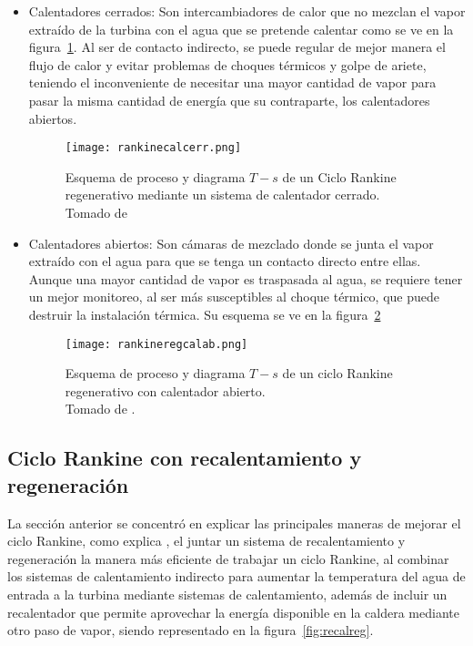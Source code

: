 \begin{itemize}
  \item Calentadores cerrados: Son intercambiadores de calor que no mezclan el vapor extraído de la turbina con el agua que se pretende calentar como se ve en la figura~\ref{fig:rankinecerr}. Al ser de contacto indirecto, se puede regular de mejor manera el flujo de calor y evitar problemas de choques térmicos y golpe de ariete, teniendo el inconveniente de necesitar una mayor cantidad de vapor para pasar la misma cantidad de energía que su contraparte, los calentadores abiertos.
    \begin{figure}[H]
  \begin{center}
    \texttt{[image: rankinecalcerr.png]}
  \end{center}
  \caption{Esquema de proceso y diagrama $T-s$ de un Ciclo Rankine regenerativo mediante un sistema de calentador cerrado. \\Tomado de \textcite{ccengel2006termodinamica}}
  \label{fig:rankinecerr}
\end{figure}
\pagebreak
  \item Calentadores abiertos: Son cámaras de mezclado donde se junta el vapor extraído con el agua para que se tenga un contacto directo entre ellas. Aunque una mayor cantidad de vapor es traspasada al agua, se requiere tener un mejor monitoreo, al ser más susceptibles al choque térmico, que puede destruir la instalación térmica. Su esquema se ve en la figura~\ref{fig:rankineregcalab}

\begin{figure}[H]
  \begin{center}
    \texttt{[image: rankineregcalab.png]}
  \end{center}
  \caption{Esquema de proceso y diagrama $T-s$ de un ciclo Rankine regenerativo con calentador abierto. \\ Tomado de \textcite{ccengel2006termodinamica}.}
  \label{fig:rankineregcalab}
\end{figure}
\end{itemize}

\subsection{Ciclo Rankine con recalentamiento y regeneración}

La sección anterior se concentró en explicar las principales maneras de mejorar el ciclo Rankine, como explica \textcite{burghardt1984ingenieria}, el juntar un sistema de recalentamiento y regeneración la manera más eficiente de trabajar un ciclo Rankine, al combinar los sistemas de calentamiento indirecto para aumentar la temperatura del agua de entrada a la turbina mediante sistemas de calentamiento, además de incluir un recalentador que permite aprovechar la energía disponible en la caldera mediante otro paso de vapor, siendo representado en la figura~\ref{fig:recalreg}.

